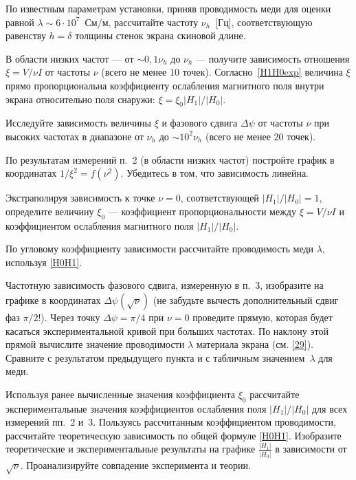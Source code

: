 \begin{lab:task}
\item По известным параметрам установки, приняв проводимость меди
для оценки равной $\lambda \sim 6\cdot 10^{7}$~См/м, рассчитайте частоту
$\nu_h$~[Гц], соответствующую равенству $h=\delta$ толщины стенок экрана 
скиновой длине.

\item В области низких частот --- от  $\sim 0,1\nu_h$ до $\nu_{h}$ --- получите зависимость отношения $\xi = V/\nu I$ от
частоты $\nu$ (всего не менее 10 точек). Согласно~\eqref{H1H0exp} величина $\xi$ прямо
пропорциональна коэффициенту ослабления магнитного поля внутри 
экрана относительно поля снаружи: $\xi=\xi_0 |H_1|/|H_0|$.

\item Исследуйте зависимость величины $\xi$ 
и фазового сдвига $\Delta\psi$ от частоты $\nu$ при высоких частотах
в диапазоне от $\nu_h$ до $\sim 10^2\nu_h$
(всего не менее 20 точек).


\item По результатам измерений п.~2 (в области низких частот)
постройте график в координатах $1/\xi^2=f(\nu^2)$.
Убедитесь в том, что зависимость линейна. 

Экстраполируя зависимость к точке $\nu=0$, соответствующей
$|H_1|/|H_0|=1$, определите величину $\xi_0$ --- коэффициент
пропорциональности между $\xi=V/\nu I$ и коэффициентом ослабления магнитного поля 
$|H_1|/|H_0|$.

По угловому коэффициенту зависимости рассчитайте проводимость меди $\lambda$,
используя \eqref{H0H1}.

\item Частотную зависимость фазового сдвига,
измеренную в п.~3, изобразите на графике в координатах 
$\Delta\psi(\sqrt{\nu})$ (не забудьте вычесть дополнительный сдвиг фаз $\pi/2$!). 
Через точку $\Delta\psi=\pi/4$ при $\nu=0$ проведите прямую, 
которая будет касаться экспериментальной кривой при больших частотах. 
По наклону этой прямой вычислите значение проводимости $\lambda$ материала экрана
(см. \eqref{29}). 
Сравните с результатом предыдущего пункта и с табличным значением~$\lambda$ для меди.

\item Используя ранее вычисленные значения коэффициента $\xi_0$ 
рассчитайте экспериментальные значения коэффициентов 
ослабления поля $|H_1|/|H_0|$ для всех измерений пп.~2 и~3.
Пользуясь рассчитанным коэффициентом проводимости,
рассчитайте теоретическую зависимость по общей формуле \eqref{H0H1}. 
Изобразите теоретические и экспериментальные результаты 
на графике $\frac{|H_1|}{|H_0|}$ в зависимости от $\sqrt{\nu}$. 
Проанализируйте совпадение эксперимента и теории.

\end{lab:task}


